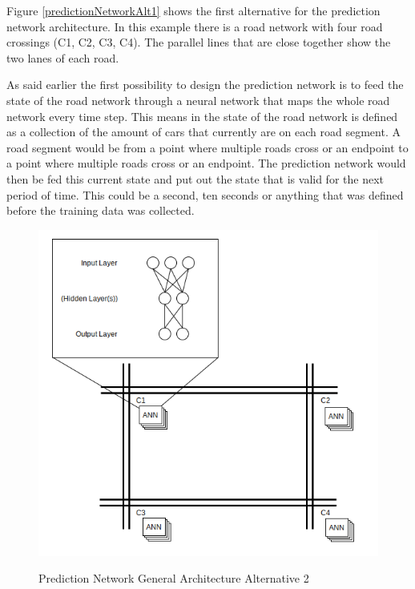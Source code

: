 
Figure \ref{predictionNetworkAlt1} shows the first alternative for the prediction network architecture. In this example there is a road network with four road crossings (C1, C2, C3, C4). The parallel lines that are close together show the two lanes of each road. 

As said earlier the first possibility to design the prediction network is to feed the state of the road network through a neural network that maps the whole road network every time step. This means in the state of the road network is defined as a collection of the amount of cars that currently are on each road segment. A road segment would be from a point where multiple roads cross or an endpoint to a point where multiple roads cross or an endpoint. The prediction network would then be fed this current state and put out the state that is valid for the next period of time. This could be a second, ten seconds or anything that was defined before the training data was collected.

\begin{figure}[!ht]
  \centering
  \includegraphics[width=16cm]{figures/predictionNetworkAlt2}
  \label{predictionNetworkAlt2}
  \caption[Prediction Network General Architecture Alternative 2]{Prediction Network General Architecture Alternative 2 \protect\footnotemark}
\end{figure}

